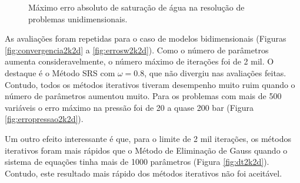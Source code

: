 \documentclass[final,5p]{elsarticle}
\numberwithin{equation}{section}
\begin{document}
        \begin{figure}[hbt!]
            \caption{Máximo erro absoluto de saturação de água na resolução de problemas unidimensionais.}
            \label{fig:errosw10k}
        \end{figure}

        As avaliações foram repetidas para o caso de modelos bidimensionais (Figuras \ref{fig:convergencia2k2d} a \ref{fig:errosw2k2d}). Como o número de parâmetros aumenta consideravelmente, o número máximo de iterações foi de 2 mil. O destaque é o Método SRS com $\omega = 0.8$, que não divergiu nas avaliações feitas. Contudo, todos os métodos iterativos tiveram desempenho muito ruim quando o número de parâmetros aumentou muito. Para os problemas com mais de 500 variáveis o erro máximo na pressão foi de 20 a quase 200 bar (Figura \ref{fig:erropressao2k2d}).

        Um outro efeito interessante é que, para o limite de 2 mil iterações, os métodos iterativos foram mais rápidos que o Método de Eliminação de Gauss quando o sistema de equações tinha mais de 1000 parâmetros (Figura \ref{fig:dt2k2d}). Contudo, este resultado mais rápido dos métodos iterativos não foi aceitável.
\end{document}
